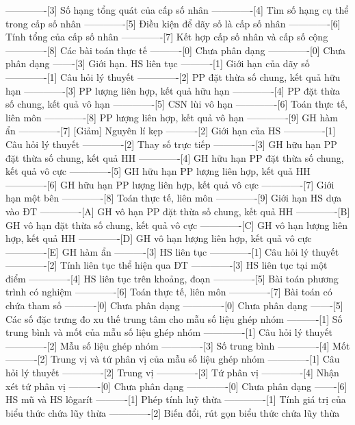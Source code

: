 -------------[3] Số hạng tổng quát của cấp số nhân
-------------[4] Tìm số hạng cụ thể trong cấp số nhân
-------------[5] Điều kiện để dãy số là cấp số nhân
-------------[6] Tính tổng của cấp số nhân
-------------[7] Kết hợp cấp số nhân và cấp số cộng
-------------[8] Các bài toán thực tế
----------[0] Chưa phân dạng
-------------[0] Chưa phân dạng
-------[3] Giới hạn. HS liên tục
----------[1] Giới hạn của dãy số
-------------[1] Câu hỏi lý thuyết
-------------[2] PP đặt thừa số chung, kết quả hữu hạn
-------------[3] PP lượng liên hợp, kết quả hữu hạn
-------------[4] PP đặt thừa số chung, kết quả vô hạn
-------------[5] CSN lùi vô hạn 
-------------[6] Toán thực tế, liên môn
-------------[8] PP lượng liên hợp, kết quả vô hạn
-------------[9] GH hàm ẩn
-------------[7] [Giảm] Nguyên lí kẹp
----------[2] Giới hạn của HS
-------------[1] Câu hỏi lý thuyết
-------------[2] Thay số trực tiếp
-------------[3] GH hữu hạn PP đặt thừa số chung, kết quả HH
-------------[4] GH hữu hạn PP đặt thừa số chung, kết quả vô cực
-------------[5] GH hữu hạn PP lượng liên hợp, kết quả HH
-------------[6] GH hữu hạn PP lượng liên hợp, kết quả vô cực
-------------[7] Giới hạn một bên
-------------[8] Toán thực tế, liên môn
-------------[9] Giới hạn HS dựa vào ĐT
-------------[A] GH vô hạn PP đặt thừa số chung, kết quả HH
-------------[B] GH vô hạn đặt thừa số chung, kết quả vô cực
-------------[C] GH vô hạn lượng liên hợp, kết quả HH
-------------[D] GH vô hạn lượng liên hợp, kết quả vô cực
-------------[E] GH hàm ẩn
----------[3] HS liên tục
-------------[1] Câu hỏi lý thuyết
-------------[2] Tính liên tục thể hiện qua ĐT
-------------[3] HS liên tục tại một điểm
-------------[4] HS liên tục trên khoảng, đoạn
-------------[5] Bài toán phương trình có nghiệm
-------------[6] Toán thực tế, liên môn
-------------[7] Bài toán có chứa tham số
----------[0] Chưa phân dạng
-------------[0] Chưa phân dạng
-------[5] Các số đặc trưng đo xu thế trung tâm cho mẫu số liệu ghép nhóm
----------[1] Số trung bình và mốt của mẫu số liệu ghép nhóm
-------------[1] Câu hỏi lý thuyết
-------------[2] Mẫu số liệu ghép nhóm
-------------[3] Số trung bình
-------------[4] Mốt
----------[2] Trung vị và tứ phân vị của mẫu số liệu ghép nhóm
-------------[1] Câu hỏi lý thuyết
-------------[2] Trung vị
-------------[3] Tứ phân vị
-------------[4] Nhận xét tứ phân vị
----------[0] Chưa phân dạng
-------------[0] Chưa phân dạng
-------[6] HS mũ và HS lôgarít
----------[1] Phép tính luỹ thừa
-------------[1] Tính giá trị của biểu thức chứa lũy thừa
-------------[2] Biến đổi, rút gọn biểu thức chứa lũy thừa
